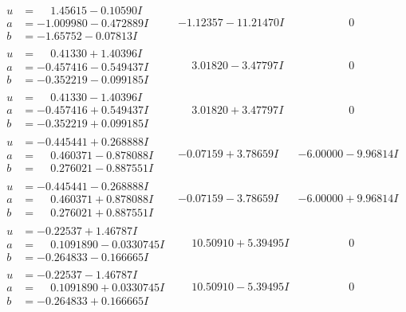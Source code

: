 \documentclass[1p]{elsarticle_modified}
\theoremstyle{definition}
\begin{document}
$$\begin{array}{c|c|c}
\begin{aligned}
u &= \phantom{-}1.45615 - 0.10590 I \\
a &= -1.009980 - 0.472889 I \\
b &= -1.65752 - 0.07813 I\end{aligned}
 & -1.12357 - 11.21470 I & \phantom{-0.000000 } 0 \\ \hline\begin{aligned}
u &= \phantom{-}0.41330 + 1.40396 I \\
a &= -0.457416 - 0.549437 I \\
b &= -0.352219 - 0.099185 I\end{aligned}
 & \phantom{-}3.01820 - 3.47797 I & \phantom{-0.000000 } 0 \\ \hline\begin{aligned}
u &= \phantom{-}0.41330 - 1.40396 I \\
a &= -0.457416 + 0.549437 I \\
b &= -0.352219 + 0.099185 I\end{aligned}
 & \phantom{-}3.01820 + 3.47797 I & \phantom{-0.000000 } 0 \\ \hline\begin{aligned}
u &= -0.445441 + 0.268888 I \\
a &= \phantom{-}0.460371 - 0.878088 I \\
b &= \phantom{-}0.276021 - 0.887551 I\end{aligned}
 & -0.07159 + 3.78659 I & -6.00000 - 9.96814 I \\ \hline\begin{aligned}
u &= -0.445441 - 0.268888 I \\
a &= \phantom{-}0.460371 + 0.878088 I \\
b &= \phantom{-}0.276021 + 0.887551 I\end{aligned}
 & -0.07159 - 3.78659 I & -6.00000 + 9.96814 I \\ \hline\begin{aligned}
u &= -0.22537 + 1.46787 I \\
a &= \phantom{-}0.1091890 - 0.0330745 I \\
b &= -0.264833 - 0.166665 I\end{aligned}
 & \phantom{-}10.50910 + 5.39495 I & \phantom{-0.000000 } 0 \\ \hline\begin{aligned}
u &= -0.22537 - 1.46787 I \\
a &= \phantom{-}0.1091890 + 0.0330745 I \\
b &= -0.264833 + 0.166665 I\end{aligned}
 & \phantom{-}10.50910 - 5.39495 I & \phantom{-0.000000 } 0 \\ \hline\begin{aligned}

\end{aligned}
\end{array}$$
\end{document}
